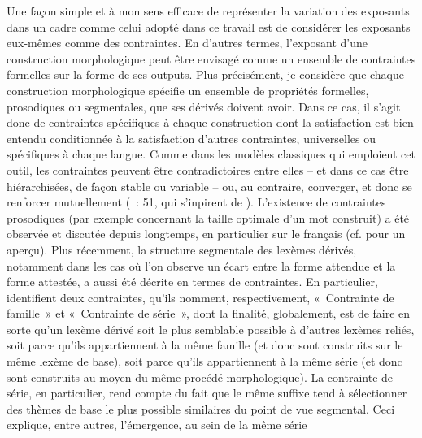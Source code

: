 \documentclass[output=paper]{langsci/langscibook}
\begin{document}
Une façon simple et à mon sens efficace de représenter la variation des
exposants dans un cadre comme celui adopté dans ce travail est de
considérer les exposants eux-mêmes comme des contraintes. En d'autres
termes, l'exposant d'une construction morphologique peut être envisagé
comme un ensemble de contraintes formelles sur la forme de ses outputs.
Plus précisément, je considère que chaque construction morphologique
spécifie un ensemble de propriétés formelles, prosodiques ou
segmentales, que ses dérivés doivent avoir. Dans ce cas, il s'agit donc
de contraintes spécifiques à chaque construction dont la satisfaction
est bien entendu conditionnée à la satisfaction d'autres contraintes,
universelles ou spécifiques à chaque langue. Comme dans les modèles
classiques qui emploient cet outil, les contraintes peuvent être
contradictoires entre elles -- et dans ce cas être hiérarchisées, de
façon stable ou variable -- ou, au contraire, converger, et donc se
renforcer mutuellement %
(\citealt{Plenat-Roche2014}~: 51, qui s'inpirent de \citealt{Burzio2002}). L'existence de contraintes prosodiques (par exemple
concernant la taille optimale d'un mot construit) a été observée et
discutée depuis longtemps, en particulier sur le français (cf. %
\citealt{Plenat09} %
%
 pour un aperçu). Plus récemment, la structure segmentale des
lexèmes dérivés, notamment dans les cas où l'on observe un écart entre
la forme attendue et la forme attestée, a aussi été décrite en termes de
contraintes. En particulier, %
\citet[1868]{roche2014.CMLF} %
%
identifient
deux contraintes, qu'ils nomment, respectivement, «~Contrainte de
famille~» et «~Contrainte de série~», dont la finalité, globalement, est
de faire en sorte qu'un lexème dérivé soit le plus semblable possible à
d'autres lexèmes reliés, soit parce qu'ils appartiennent à la même
famille (et donc sont construits sur le même lexème de base), soit parce
qu'ils appartiennent à la même série (et donc sont construits au moyen
du même procédé morphologique). La contrainte de série, en particulier,
rend compte du fait que le même suffixe tend à sélectionner des thèmes
de base le plus possible similaires du point de vue segmental. Ceci
explique, entre autres, l'émergence, au sein de la même série
\end{document}
